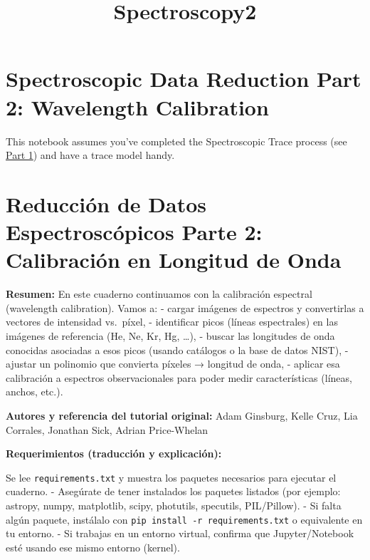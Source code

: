 \documentclass[11pt]{article}
\title{Spectroscopy2}
\begin{document}
    
    \maketitle
    
    

    
    \hypertarget{spectroscopic-data-reduction-part-2-wavelength-calibration}{%
\section{Spectroscopic Data Reduction Part 2: Wavelength
Calibration}\label{spectroscopic-data-reduction-part-2-wavelength-calibration}}

This notebook assumes you've completed the Spectroscopic Trace process
(see \href{1-SpectroscopicTraceTutorial.ipynb}{Part 1}) and have a trace
model handy.

\hypertarget{reducciuxf3n-de-datos-espectroscuxf3picos-parte-2-calibraciuxf3n-en-longitud-de-onda}{%
\section{Reducción de Datos Espectroscópicos Parte 2: Calibración en
Longitud de
Onda}\label{reducciuxf3n-de-datos-espectroscuxf3picos-parte-2-calibraciuxf3n-en-longitud-de-onda}}

\textbf{Resumen:} En este cuaderno continuamos con la calibración
espectral (wavelength calibration). Vamos a: - cargar imágenes de
espectros y convertirlas a vectores de intensidad vs.~píxel, -
identificar picos (líneas espectrales) en las imágenes de referencia
(He, Ne, Kr, Hg, \ldots), - buscar las longitudes de onda conocidas
asociadas a esos picos (usando catálogos o la base de datos NIST), -
ajustar un polinomio que convierta píxeles → longitud de onda, - aplicar
esa calibración a espectros observacionales para poder medir
características (líneas, anchos, etc.).

\textbf{Autores y referencia del tutorial original:} Adam Ginsburg,
Kelle Cruz, Lia Corrales, Jonathan Sick, Adrian Price-Whelan

    \textbf{Requerimientos (traducción y explicación):}

Se lee \texttt{requirements.txt} y muestra los paquetes necesarios para
ejecutar el cuaderno. - Asegúrate de tener instalados los paquetes
listados (por ejemplo: astropy, numpy, matplotlib, scipy, photutils,
specutils, PIL/Pillow). - Si falta algún paquete, instálalo con
\texttt{pip\ install\ -r\ requirements.txt} o equivalente en tu entorno.
- Si trabajas en un entorno virtual, confirma que Jupyter/Notebook esté
usando ese mismo entorno (kernel).
\end{document}
